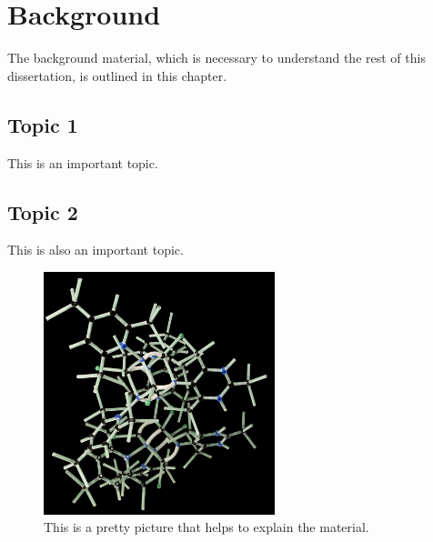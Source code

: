 %
%
%

\chapter{Background}
\label{chp:background}

The background material, which is necessary to understand the rest of this dissertation, is outlined in this chapter.

\section{Topic 1}
\label{sec:topic1}

This is an important topic.

\section{Topic 2}
\label{sec:topic2}

This is also an important topic.

\begin{figure} %
\begin{center}
\includegraphics[width=0.6\textwidth]{figs/figure1.jpg} %
\caption[a picture] %
{\label{fig:picture}
%                                                                                                                                                                               
This is a pretty picture that helps to explain the material.
}
\end{center}
\end{figure}
